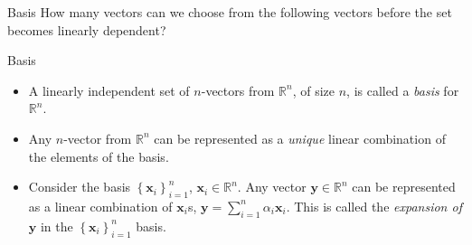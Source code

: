 \documentclass[aspectratio=169]{beamer}
\let\olditem\item
\renewcommand{\item}{\setlength{\itemsep}{\fill}\olditem}
\begin{document}
  
\begin{frame}[t]{Basis}
How many vectors can we choose from the following vectors before the set becomes linearly dependent?
  
  \begin{center}
  \begin{center}
  \end{center}
  \end{center}
\end{frame}
  
  
\begin{frame}[t]{Basis}
  \begin{itemize}
    \item A linearly independent set of $n$-vectors from $\mathbb{R}^n$, of size $n$, is called a \textit{basis} for $\mathbb{R}^n$.
  
    \item Any $n$-vector from $\mathbb{R}^n$ can be represented as a \textit{unique} linear combination of the elements of the basis.
    
    \item Consider the basis $\left\{\mathbf{x}_i\right\}_{i=1}^{n}$, $\mathbf{x}_i \in \mathbb{R}^n$. Any vector $\mathbf{y} \in \mathbb{R}^n$ can be represented as a linear combination of $\mathbf{x}_i$s, $\mathbf{y} = \sum_{i=1}^n \alpha_i\mathbf{x}_i$. This is called the \textit{expansion of} $\mathbf{y}$ in the $\left\{\mathbf{x}_i\right\}_{i=1}^n$ basis.
  \end{itemize}
\end{frame}
  
\end{document}
